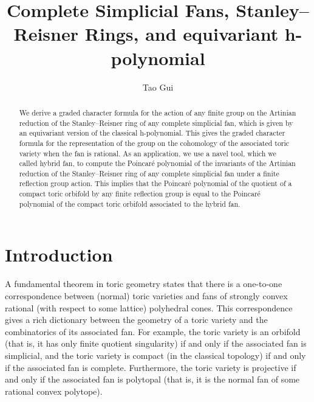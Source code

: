 \documentclass{amsart}
\author@andify\authors
\theoremstyle{definition}
\theoremstyle{remark}
\numberwithin{equation}{section}
\begin{document}
\title{Complete Simplicial Fans, Stanley--Reisner Rings, and equivariant h-polynomial}

\author{Tao Gui}
\address{(Tao Gui) \newline \indent Beijing International Center for Mathematical Research, Peking University, No.\ 5 Yiheyuan Rd, Haidian District, Beijing 100871, China}



\begin{abstract}
We derive a graded character formula for the action of any finite group on the Artinian reduction of the Stanley--Reisner ring of any complete simplicial fan, which is given by an equivariant version of the classical h-polynomial. This gives the graded character formula for the representation of the group on the cohomology of the associated toric variety when the fan is rational. 
As an application, we use a navel tool, which we called hybrid fan, to compute the Poincar\'e polynomial of the invariants of the Artinian reduction of the Stanley--Reisner ring of any complete simplicial fan under a finite reflection group action. This implies that the Poincar\'e polynomial of the quotient of a compact toric orbifold by any finite reflection group is equal to the Poincar\'e polynomial of the compact toric orbifold associated to the hybrid fan.
\end{abstract}

\maketitle

\setcounter{tocdepth}{2}

\section{Introduction}
A fundamental theorem in toric geometry states that there is a one-to-one correspondence between (normal) toric varieties and fans of strongly convex rational (with respect to some lattice) polyhedral cones\cite{davis1991convex}. This correspondence gives a rich dictionary between the geometry of a toric variety and the combinatorics of its associated fan. For example, the toric variety is an orbifold (that is, it has only finite quotient singularity) if and only if the associated fan is simplicial, and the toric variety is compact (in the classical topology) if and only if the associated fan is complete\cite[Theorem 3.1.19]{cox2024toric}. Furthermore, the toric variety is projective if and only if the associated fan is polytopal (that is, it is the normal fan of some rational convex polytope)\cite[Theorem 6.2.1]{cox2024toric}. 
\end{document}

